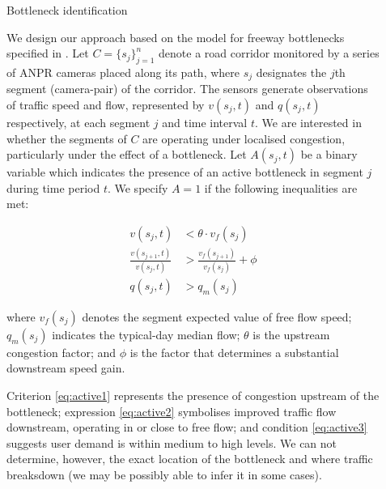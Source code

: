 \documentclass[final]{beamer}
\newlength{\sepwidth}
\newlength{\colwidth}
\newcommand{\separatorcolumn}{\begin{column}{\sepwidth}\end{column}}
\begin{document}
\begin{frame}[t]
\begin{columns}[t]
\begin{column}{\colwidth}
\begin{block}{Bottleneck identification }


    We design our approach based on the model for freeway bottlenecks specified
    in \cite{chen2004}.
    Let $C = \{ s_j \}_{j=1}^{n}$ denote a road corridor monitored by a series
    of ANPR cameras placed along its path, where $s_j$ designates the $j$th
    segment (camera-pair) of the corridor. The sensors generate
    observations of traffic speed and flow, represented by $v(s_j, t)$ and
    $q(s_j, t)$ respectively, at each segment $j$ and time interval $t$. We are
    interested in whether the segments of $C$ are operating under localised
    congestion, particularly under the effect of a bottleneck. Let $A(s_j,t)$
    be a binary variable which indicates the presence of an active bottleneck in
    segment $j$ during time period $t$. We specify $A=1$ if the following
    inequalities are met:

    \begin{align}
    v(s_j, t) &< \theta \cdot v_f(s_j) \label{eq:active1} \\[10pt]
    \frac{v(s_{j+1}, t)}{v(s_j, t)} &> \frac{v_f(s_{j+1})}{v_f(s_j)} + \phi \label{eq:active2} \\[10pt]
    q(s_j, t) &> q_m(s_j) \label{eq:active3}
    \end{align}

    where $v_f(s_j)$ denotes the segment expected value of free flow speed;
     $q_m(s_j)$ indicates the typical-day median flow; $\theta$ is the
    upstream congestion factor; and $\phi$ is the factor that determines a
    substantial downstream speed gain.

    Criterion \ref{eq:active1} represents the presence of congestion upstream
    of the bottleneck; expression \ref{eq:active2} symbolises improved traffic
    flow downstream, operating in or close to free flow; and condition
    \ref{eq:active3} suggests user demand is within medium to high levels.
    We can not determine, however, the exact location of the bottleneck and
    where traffic breaksdown (we may be possibly able to infer it in some cases).

  \end{block}

\end{column}

\separatorcolumn

\begin{column}{\colwidth}


\end{column}
\end{columns}
\end{frame}
\end{document}
